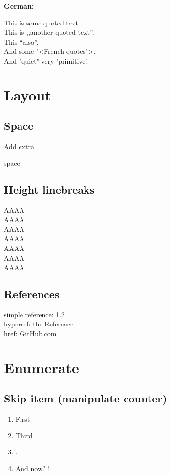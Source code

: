 \documentclass[a4paper, 11pt]{article}
\begin{document}
			\vspace{\baselineskip}			
			\textbf{German:}\\
			\begin{otherlanguage}{ngerman}
				This is \glqq some quoted text\grqq. \\
				This is ,,another quoted text''. \\
				This "`also"'. \\
				And some "<French quotes">. \\
				And "quiet" very 'primitive'.
			\end{otherlanguage}
	    
	    
	\section{Layout}\label{sec:layout}
		\subsection{Space}
			Add extra
			
			\vspace{2\baselineskip}
			
			space.
			
		\subsection{Height linebreaks}
			AAAA \\
			AAAA \\[.1ex]
			AAAA \\[1ex]			
			AAAA \\[2ex]			
			AAAA \\[5ex]				
			AAAA \\[1.5cm]		
			AAAA

		\subsection{References}
			\label{theLabel}
			simple reference: \ref{theLabel} \\
			hyperref: \hyperref[theLabel]{the Reference} \\
			href: \href{https://github.com}{GitHub.com}

	\section{Enumerate}\label{sec:enumerate}
		\subsection{Skip item (manipulate counter)}
		\begin{enumerate}
			\item First
			\addtocounter{enumi}{1}
			\item Third
			\item {}.
			\setcounter{enumi}{41}
			\item And now? \theenumi!
		\end{enumerate}
\end{document}
